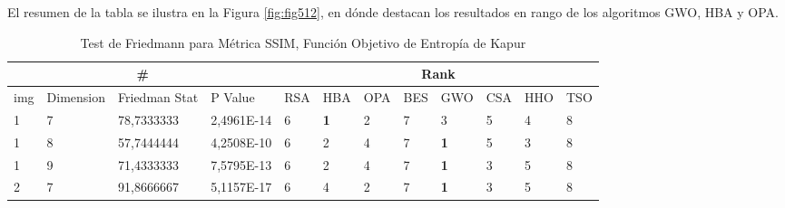 \documentclass[conference]{IEEEtran}
\begin{document}
\noindent El resumen de la tabla se ilustra en la Figura \ref{fig:fig512}, en dónde destacan los resultados en rango de los algoritmos GWO, HBA y OPA.
\begin{table}[]
	\centering
	\caption{Test de Friedmann para Métrica SSIM, Función Objetivo de Entropía de Kapur}
	\begin{tabular}{|llll|llllllll|}
		\hline
		\multicolumn{4}{|c|}{\#} & \multicolumn{8}{c|}{Rank} \\ \hline
		\multicolumn{1}{|l|}{img} & \multicolumn{1}{l|}{Dimension} & \multicolumn{1}{l|}{Friedman Stat} & P Value    & \multicolumn{1}{l|}{RSA} & \multicolumn{1}{l|}{HBA}        & \multicolumn{1}{l|}{OPA}        & \multicolumn{1}{l|}{BES} & \multicolumn{1}{l|}{GWO}        & \multicolumn{1}{l|}{CSA}        & \multicolumn{1}{l|}{HHO}        & TSO                    \\ \hline                                                                                                                                                                       
		\multicolumn{1}{|l|}{1}   & \multicolumn{1}{l|}{7}         & \multicolumn{1}{l|}{78,7333333}    & 2,4961E-14 & \multicolumn{1}{l|}{6}   & \multicolumn{1}{l|}{\textbf{1}} & \multicolumn{1}{l|}{2}          & \multicolumn{1}{l|}{7}   & \multicolumn{1}{l|}{3}          & \multicolumn{1}{l|}{5}          & \multicolumn{1}{l|}{4}          & 8                      \\ \hline
		\multicolumn{1}{|l|}{1}   & \multicolumn{1}{l|}{8}         & \multicolumn{1}{l|}{57,7444444}    & 4,2508E-10 & \multicolumn{1}{l|}{6}   & \multicolumn{1}{l|}{2}          & \multicolumn{1}{l|}{4}          & \multicolumn{1}{l|}{7}   & \multicolumn{1}{l|}{\textbf{1}} & \multicolumn{1}{l|}{5}          & \multicolumn{1}{l|}{3}          & 8                      \\ \hline
		\multicolumn{1}{|l|}{1}   & \multicolumn{1}{l|}{9}         & \multicolumn{1}{l|}{71,4333333}    & 7,5795E-13 & \multicolumn{1}{l|}{6}   & \multicolumn{1}{l|}{2}          & \multicolumn{1}{l|}{4}          & \multicolumn{1}{l|}{7}   & \multicolumn{1}{l|}{\textbf{1}} & \multicolumn{1}{l|}{3}          & \multicolumn{1}{l|}{5}          & 8                      \\ \hline
		\multicolumn{1}{|l|}{2}   & \multicolumn{1}{l|}{7}         & \multicolumn{1}{l|}{91,8666667}    & 5,1157E-17 & \multicolumn{1}{l|}{6}   & \multicolumn{1}{l|}{4}          & \multicolumn{1}{l|}{2}          & \multicolumn{1}{l|}{7}   & \multicolumn{1}{l|}{\textbf{1}} & \multicolumn{1}{l|}{3}          & \multicolumn{1}{l|}{5}          & 8                      \\ \hline

\end{tabular}
\end{table}
\end{document}

